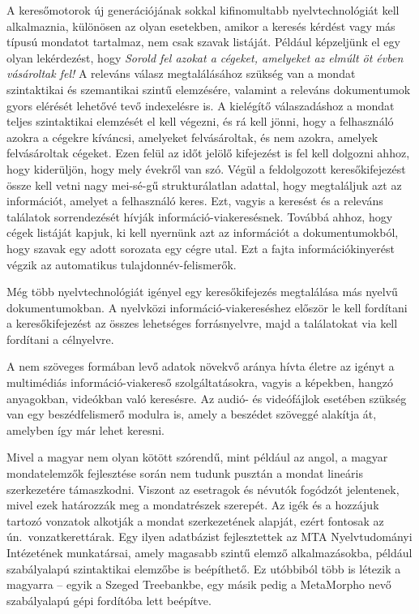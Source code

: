 \begin{multicols}{2}
  A keresőmotorok új generációjának sokkal kifinomultabb nyelvtechnológiát kell al\-kal\-maz\-nia, különösen az olyan esetekben, amikor a keresés kérdést vagy más típusú mondatot tartalmaz, nem csak szavak listáját. Például képzeljünk el egy olyan lekérdezést, hogy \textit{Sorold fel azokat a cégeket, amelyeket az elmúlt öt évben vásároltak fel!} A releváns válasz megtalálásához szükség van a mondat szintaktikai és szemantikai szintű elem\-zé\-sé\-re, valamint a releváns dokumentumok gyors elérését lehetővé tevő indexelésre is. A kielégítő válaszadáshoz a mondat teljes szintaktikai elemzését el kell végezni, és rá kell jönni, hogy a felhasználó azokra a cégekre kíváncsi, amelyeket felvásároltak, és nem azokra, amelyek felvásároltak cégeket. Ezen felül az időt jelölő kifejezést is fel kell dolgozni ahhoz, hogy kiderüljön, hogy mely évekről van szó. Végül a feldolgozott keresőkifejezést össze kell vetni nagy mei-sé-gű strukturálatlan adattal, hogy megtaláljuk azt az információt, amelyet a felhasználó keres. Ezt, vagyis a keresést és a releváns találatok sorrendezését hívják információ-viakeresésnek. Továbbá ahhoz, hogy cégek listáját kapjuk, ki kell nyernünk azt az információt a dokumentumokból, hogy szavak egy adott sorozata egy cégre utal. Ezt a fajta információkinyerést végzik az automatikus tulajdonnév-felismerők.  


  Még több nyelvtechnológiát igényel egy keresőkifejezés megtalálása más nyelvű dokumentumokban. A nyelvközi in\-for\-má\-ció-viakereséshez először le kell fordítani a keresőkifejezést az összes lehetséges forrásnyelvre, majd a találatokat via kell fordítani a célnyelvre. 

  A nem szöveges formában levő adatok növekvő aránya hívta életre az igényt a multimédiás információ-viakereső szolgáltatásokra, vagyis a képekben, hangzó anyagokban, videókban való keresésre. Az audió- és videófájlok esetében szükség van egy beszédfelismerő modulra is, amely a beszédet szöveggé alakítja át, amelyben így már lehet keresni.

  Mivel a magyar nem olyan kötött szórendű, mint például az angol, a magyar mondatelemzők fejlesztése során nem tudunk pusztán a mondat lineáris szerkezetére támaszkodni. Viszont az esetragok és névutók fogódzót jelentenek, mivel ezek határozzák meg a mondatrészek szerepét. Az igék és a hozzájuk tartozó vonzatok alkotják a mondat szerkezetének alapját, ezért fontosak az ún.\ vonzatkerettárak. Egy ilyen adatbázist fejlesztettek az MTA Nyelvtudományi Intézetének munkatársai, amely magasabb szintű elemző alkalmazásokba, például szabályalapú szintaktikai elem\-ző\-be is beépíthető. Ez utóbbiból több is létezik a magyarra -- egyik a Szeged Treebankbe, egy másik pedig a MetaMorpho nevő szabályalapú gépi fordítóba lett beépítve. 


\end{multicols}
